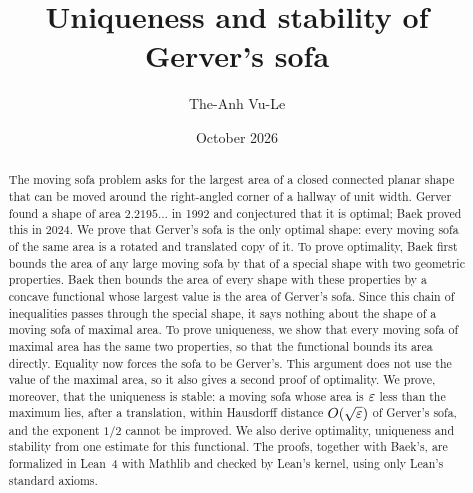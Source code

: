 \documentclass[11pt,reqno]{amsart}
\title{Uniqueness and stability of Gerver's sofa}
\author{The-Anh Vu-Le}
\date{October 2026}
\theoremstyle{plain}
\theoremstyle{definition}
\theoremstyle{remark}
\numberwithin{equation}{section}
\begin{document}
\begin{abstract}
  The moving sofa problem asks for the largest area of a closed connected planar
  shape that can be moved around the right-angled corner of a hallway of unit
  width. Gerver found a shape of area $2.2195\ldots$ in 1992 and conjectured
  that it is optimal; Baek proved this in 2024. We prove that Gerver's sofa is
  the only optimal shape: every moving sofa of the same area is a rotated and
  translated copy of it. To prove optimality, Baek first bounds the area of any
  large moving sofa by that of a special shape with two geometric properties.
  Baek then bounds the area of every shape with these properties by a concave
  functional whose largest value is the area of Gerver's sofa. Since this chain
  of inequalities passes through the special shape, it says nothing about the
  shape of a moving sofa of maximal area. To prove uniqueness, we show that
  every moving sofa of maximal area has the same two properties, so that the
  functional bounds its area directly. Equality now forces the sofa to be
  Gerver's. This argument does not use the value of the maximal area, so it also
  gives a second proof of optimality. We prove, moreover, that the uniqueness is
  stable: a moving sofa whose area is $\varepsilon$ less than the maximum lies, after a
  translation, within Hausdorff distance $O(\sqrt{\varepsilon})$ of Gerver's sofa, and
  the exponent $1/2$ cannot be improved. We also derive optimality, uniqueness
  and stability from one estimate for this functional. The proofs, together
  with Baek's, are formalized in Lean~4 with Mathlib and checked by Lean's
  kernel, using only Lean's standard axioms.
\end{abstract}

\maketitle














\appendix








\end{document}
